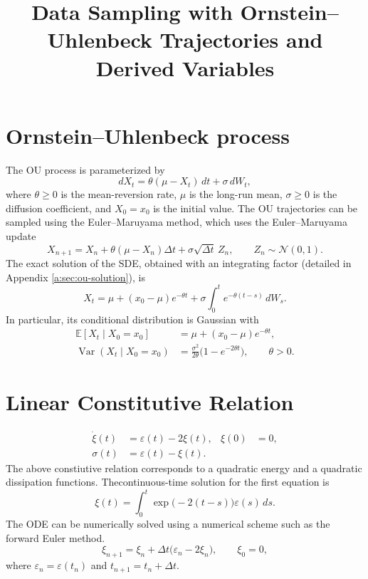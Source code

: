 \documentclass[11pt]{article}
\title{Data Sampling with Ornstein--Uhlenbeck Trajectories and Derived Variables}
\author{}
\date{}
\begin{document}
\maketitle

\section{Ornstein--Uhlenbeck process}

The OU process is parameterized by
\begin{equation}
    dX_t = \theta(\mu-X_t)\,dt + \sigma\,dW_t,
\end{equation}
where $\theta \geq 0$ is the mean-reversion rate, $\mu$ is the long-run mean,
$\sigma \geq 0$ is the diffusion coefficient, and $X_0=x_0$ is the initial
value. The OU trajectories can be sampled using the Euler--Maruyama method,
which uses the Euler--Maruyama update
\begin{equation}
    X_{n+1}=X_n+\theta(\mu-X_n)\Delta t
    +\sigma\sqrt{\Delta t}\,Z_n,
    \qquad Z_n\sim\mathcal{N}(0,1).
\end{equation}
The exact solution of the SDE, obtained with an integrating factor (detailed in Appendix \ref{a:sec:ou-solution}), is
\begin{equation}
    X_t=\mu+(x_0-\mu)e^{-\theta t}
    +\sigma\int_0^t e^{-\theta(t-s)}\,dW_s.
\end{equation}
In particular, its conditional distribution is Gaussian with
\begin{align}
    \mathbb{E}[X_t\mid X_0=x_0]
     & =\mu+(x_0-\mu)e^{-\theta t},                           \\
    \operatorname{Var}(X_t\mid X_0=x_0)
     & =\frac{\sigma^2}{2\theta}\bigl(1-e^{-2\theta t}\bigr),
    \qquad \theta>0.
\end{align}
\section{Linear Constitutive Relation}
\begin{align}
    \dot{\xi}(t) & = \varepsilon(t)-2\xi(t), & \xi(0) & =0, \\
    \sigma(t)    & = \varepsilon(t)-\xi(t).
\end{align}
The above constiutive relation corresponds to a quadratic energy and a quadratic dissipation functions. Thecontinuous-time solution for the first equation is
\begin{equation}
    \xi(t)=\int_0^t \exp\bigl(-2(t-s)\bigr)\varepsilon(s)\,ds.
\end{equation}
The ODE can be numerically solved using a numerical scheme such as the forward Euler method.
\begin{equation}
    \xi_{n+1}=\xi_n+\Delta t\bigl(\varepsilon_n-2\xi_n\bigr),
    \qquad \xi_0=0,
\end{equation}
where $\varepsilon_n=\varepsilon(t_n)$ and $t_{n+1}=t_n+\Delta t$.
\end{document}
